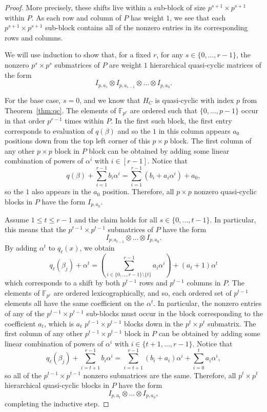 \documentclass[11pt]{amsart}
\theoremstyle{definition}
\newcommand{\0}{\mathbf{0}}
\newcommand{\F}{\mathbb{F}}
\begin{document}
\begin{proof}
    More precisely, these shifts live within a sub-block of size $p^{s+1} \times p^{s+1}$ within $P$. As each row and column of $P$ has weight $1$, we see that each $p^{s+1} \times p^{s+1}$ sub-block contains all of the nonzero entries in its corresponding rows and columns.

    We will use induction to show that, for a fixed $r$, for any $s \in\{0, \dotsc, r-1\}$, the nonzero $p^s \times p^s$ submatrices of $P$ are weight $1$ hierarchical quasi-cyclic matrices of the form 
    \[ I_{p,a_s} \otimes I_{p,a_{s-1}} \otimes \dots \otimes I_{p,a_0}. \]
    
    For the base case, $s=0$, and we know that $H_C$ is quasi-cyclic with index $p$ from Theorem~\ref{thm:qc}. 
    The elements of $\F_{p^r}$ are ordered such that $\{0, \dotsc, p-1\}$ occur in that order $p^{r-1}$ times within $P$. In the first such block, the first entry corresponds to evaluation of $q(\beta)$ and so the $1$ in this column appears $a_0$ positions down from the top left corner of this $p \times p$ block. The first column of any other $p \times p$ block in $P$ block can be obtained by adding some linear combination of powers of $\alpha^i$ with $i \in [r-1]$. Notice that
    \[ q(\beta) + \sum_{i=1}^{r-1} b_i \alpha^i = \sum_{i=1}^{r-1}(b_i + a_i\alpha^i) + a_0,\]
    so the $1$ also appears in the $a_0$ position. Therefore, all $p \times p$ nonzero quasi-cyclic blocks in $P$ have the form $I_{p,a_0}$.

    Assume $1 \leq t \leq r-1$ and the claim holds for all $s \in \{0, \dotsc, t-1\}$. In particular, this means that the $p^{t-1} \times p^{t-1}$ submatrices of $P$ have the form 
    \[ I_{p,a_{t-1}} \otimes \dots \otimes I_{p,a_0}.\]
    By adding $\alpha^t$ to $q_\ell(x)$, we obtain
    \[q_\ell(\beta_j) + \alpha^t =  \left( \sum_{i \in \{0, \dotsc, r-1\} \setminus \{t\}}^{r-1} a_i \alpha^i \right) + (a_t+1)\alpha^t\]
    which corresponds to a shift by both $p^{t-1}$ rows and $p^{t-1}$ columns in $P$. The elements of $\F_{p^r}$ are ordered lexicographically, and so, each ordered set of $p^{t-1}$ elements all have the same coefficient on the $\alpha^t$. In particular, the nonzero entries of any of the $p^{t-1} \times p^{t-1}$ sub-blocks must occur in the block corresponding to the coefficient $a_t$, which is $a_t$ $p^{t-1} \times p^{t-1}$ blocks down in the $p^t \times p^t$ submatrix. The first column of any other $p^{t-1} \times p^{t-1}$ block in $P$ can be obtained by adding some linear combination of powers of $\alpha^i$ with $i \in \{t+1, \dotsc, r-1\}$. Notice that
    \[ q_\ell (\beta_j) + \sum_{i=t+1}^{r-1} b_i \alpha^i = \sum_{i=t+1}^{r-1}(b_i + a_i)\alpha^i + \sum_{i=0}^t a_i \alpha^i,\] 
    so all of the $p^{t-1} \times p^{t-1}$ nonzero submatrices are the same. Therefore, all $p^t \times p^t$ hierarchical quasi-cyclic blocks in $P$ have the form
    \[ I_{p,a_{t}} \otimes \dots \otimes I_{p,a_0},\]
    completing the inductive step.
\end{proof}
\end{document}
